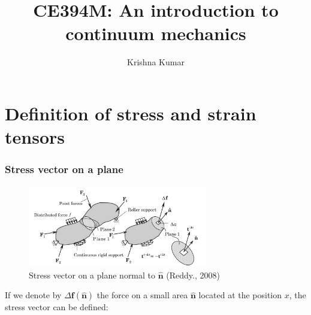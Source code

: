 \documentclass[notes]{beamer}
\title[CE394M: Continuum mechanics]{CE394M: An introduction to continuum mechanics}
\author{Krishna Kumar} %
\institute[UT Austin] %
{
University of Texas at Austin \\
\medskip
\textit{
  \url{krishnak@utexas.edu}} %
}
\date{} %
\begin{document}
\begin{frame}
\titlepage %
\end{frame}
%

\section{Definition of stress and strain tensors}


\begin{frame}
\frametitle{Stress vector on a plane}
\begin{figure}[ht]
	\centering
	\includegraphics[width=0.7\textwidth]{figs/stress-vector-plane.png}
	\caption*{Stress vector on a plane normal to $\mathbf{\hat{n}}$ (Reddy., 2008)}
\end{figure}

If we denote by $\Delta \mathbf{f(\hat{n})}$ the force on a small area $\mathbf{\hat{n}}$ located at the position $x$, the stress vector can be defined:
\end{frame}
\end{document}
